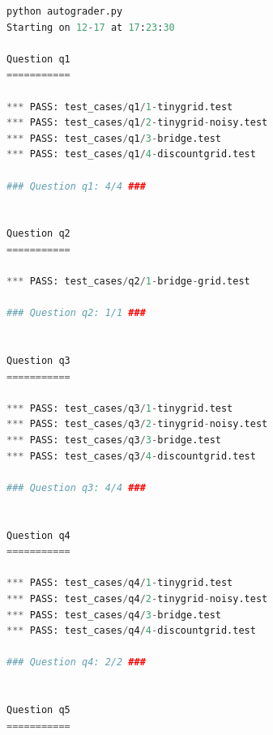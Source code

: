 \documentclass{report}
\begin{document}
\begin{lstlisting}[language=Python, caption=Autograder]
python autograder.py
Starting on 12-17 at 17:23:30

Question q1
===========

*** PASS: test_cases/q1/1-tinygrid.test
*** PASS: test_cases/q1/2-tinygrid-noisy.test
*** PASS: test_cases/q1/3-bridge.test
*** PASS: test_cases/q1/4-discountgrid.test

### Question q1: 4/4 ###


Question q2
===========

*** PASS: test_cases/q2/1-bridge-grid.test

### Question q2: 1/1 ###


Question q3
===========

*** PASS: test_cases/q3/1-tinygrid.test
*** PASS: test_cases/q3/2-tinygrid-noisy.test
*** PASS: test_cases/q3/3-bridge.test
*** PASS: test_cases/q3/4-discountgrid.test

### Question q3: 4/4 ###


Question q4
===========

*** PASS: test_cases/q4/1-tinygrid.test
*** PASS: test_cases/q4/2-tinygrid-noisy.test
*** PASS: test_cases/q4/3-bridge.test
*** PASS: test_cases/q4/4-discountgrid.test

### Question q4: 2/2 ###


Question q5
===========


\end{lstlisting}
\end{document}
